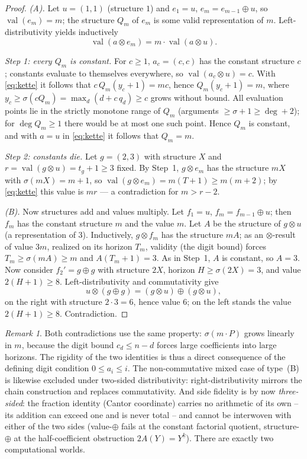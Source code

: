 \documentclass[11pt]{article}
\theoremstyle{definition}
\theoremstyle{remark}
\newtheorem{bemerkung}[satz]{Remark}
\newcommand{\val}{\operatorname{val}}
\begin{document}
\begin{proof}
\emph{(A).} Let $u=(1,1)$ (structure $1$) and $e_1=u$,
$e_m=e_{m-1}\oplus u$, so $\val(e_m)=m$; the structure $Q_m$ of
$e_m$ is some valid representation of $m$.
Left-distributivity yields inductively
\begin{equation}\label{eq:kette}
\val(a\otimes e_m)=m\cdot\val(a\otimes u).
\end{equation}

\emph{Step 1: every $Q_m$ is constant.} For $c\ge1$, $a_c=(c,c)$
has the constant structure $c$; constants evaluate to themselves
everywhere, so $\val(a_c\otimes u)=c$. With \eqref{eq:kette} it
follows that $c\,Q_m(y_c{+}1)=mc$, hence $Q_m(y_c{+}1)=m$, where
$y_c\ge\sigma(cQ_m)=\max_d(d+c\,q_d)\ge c$ grows without bound. All
evaluation points lie in the strictly monotone range of $Q_m$
(arguments $\ge\sigma+1\ge\deg+2$); for $\deg Q_m\ge1$ there would
be at most one such point. Hence $Q_m$ is constant, and with
$a=u$ in \eqref{eq:kette} it follows that $Q_m=m$.

\emph{Step 2: constants die.} Let $g=(2,3)$ with structure
$X$ and $r=\val(g\otimes u)=t_g{+}1\ge3$ fixed. By Step~1,
$g\otimes e_m$ has the structure $mX$ with $\sigma(mX)=m{+}1$, so
$\val(g\otimes e_m)=m(T{+}1)\ge m(m{+}2)$; by \eqref{eq:kette}
this value is $mr$ --- a contradiction for $m>r-2$.

\emph{(B).} Now structures add and values multiply. Let $f_1=u$,
$f_m=f_{m-1}\oplus u$; then $f_m$ has the constant structure $m$
and the value $m$. Let $A$ be the structure of
$g\otimes u$ (a representation of $3$). Inductively, $g\otimes f_m$
has the structure $mA$; as an $\otimes$-result of value $3m$,
realized on its horizon $T_m$, validity (the digit bound) forces
$T_m\ge\sigma(mA)\ge m$ and $A(T_m{+}1)=3$. As in Step~1,
$A$ is constant, so $A=3$. Now consider $f_2'=g\oplus g$ with
structure $2X$, horizon $H\ge\sigma(2X)=3$, and value
$2(H{+}1)\ge8$. Left-distributivity and commutativity give
\[
u\otimes(g\oplus g)=(g\otimes u)\oplus(g\otimes u),
\]
on the right with structure $2\cdot3=6$, hence value $6$; on the
left stands the value $2(H{+}1)\ge8$. Contradiction.
\end{proof}

\begin{bemerkung}
Both contradictions use the same property:
$\sigma(m\cdot P)$ grows linearly in $m$, because the digit bound
$c_d\le n-d$ forces large coefficients into large horizons. The
rigidity of the two identities is thus a direct consequence of the
defining digit condition $0\le a_i\le i$. The non-commutative mixed
case of type~(B) is likewise excluded under two-sided
distributivity: right-distributivity mirrors the chain
construction and replaces commutativity. And side fidelity is by
now \emph{three-sided}: the fraction identity (Cantor coordinate)
carries no arithmetic of its own -- its addition can exceed one and
is never total -- and cannot be interwoven with either of the two
sides (value-$\oplus$ fails at the constant factorial quotient,
structure-$\oplus$ at the half-coefficient obstruction
$2A(Y)=Y^{\underline k}$).
There are exactly two computational worlds.
\end{bemerkung}
\end{document}
